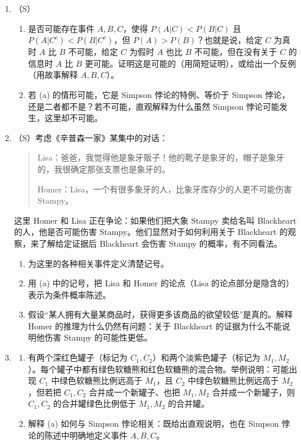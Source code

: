 \documentclass[UTF8, 12pt, fontset=fandol, oneside]{ctexart}
\begin{document}
\begin{enumerate}
\subsection*{Simpson 悖论}

  \item （S）
  \begin{enumerate}
    \item 是否可能存在事件 $A,B,C$，使得 $P(A|C)<P(B|C)$ 且 $P(A|C^c)<P(B|C^c)$，但 $P(A)>P(B)$？也就是说，给定 $C$ 为真时 $A$ 比 $B$ 不可能，给定 $C$ 为假时 $A$ 也比 $B$ 不可能，但在没有关于 $C$ 的信息时 $A$ 比 $B$ 更可能。证明这是可能的（用简短证明），或给出一个反例（用故事解释 $A,B,C$）。
    \item 若 (a) 的情形可能，它是 Simpson 悖论的特例、等价于 Simpson 悖论，还是二者都不是？若不可能，直观解释为什么虽然 Simpson 悖论可能发生，这里却不可能。
  \end{enumerate}

  \item （S）考虑《辛普森一家》某集中的对话：
  \begin{quote}
  Lisa：爸爸，我觉得他是象牙贩子！他的靴子是象牙的，帽子是象牙的，我很确定那张支票也是象牙的。

  Homer：Lisa，一个有很多象牙的人，比象牙库存少的人更不可能伤害 Stampy。
  \end{quote}
  这里 Homer 和 Lisa 正在争论：如果他们把大象 Stampy 卖给名叫 Blackheart 的人，他是否可能伤害 Stampy。他们显然对于如何利用关于 Blackheart 的观察，来了解给定证据后 Blackheart 会伤害 Stampy 的概率，有不同看法。
  \begin{enumerate}
    \item 为这里的各种相关事件定义清楚记号。
    \item 用 (a) 中的记号，把 Lisa 和 Homer 的论点（Lisa 的论点部分是隐含的）表示为条件概率陈述。
    \item 假设“某人拥有大量某商品时，获得更多该商品的欲望较低”是真的。解释 Homer 的推理为什么仍然有问题：关于 Blackheart 的证据为什么不能说明他伤害 Stampy 的可能性更低。
  \end{enumerate}

  \item
  \begin{enumerate}
    \item 有两个深红色罐子（标记为 $C_1,C_2$）和两个淡紫色罐子（标记为 $M_1,M_2$）。每个罐子中都有绿色软糖熊和红色软糖熊的混合物。举例说明：可能出现 $C_1$ 中绿色软糖熊比例远高于 $M_1$，且 $C_2$ 中绿色软糖熊比例远高于 $M_2$，但若把 $C_1,C_2$ 合并成一个新罐子、也把 $M_1,M_2$ 合并成一个新罐子，则 $C_1,C_2$ 的合并罐绿色比例低于 $M_1,M_2$ 的合并罐。
    \item 解释 (a) 如何与 Simpson 悖论相关：既给出直观说明，也在 Simpson 悖论的陈述中明确地定义事件 $A,B,C$。
  \end{enumerate}


\end{enumerate}
\end{document}
